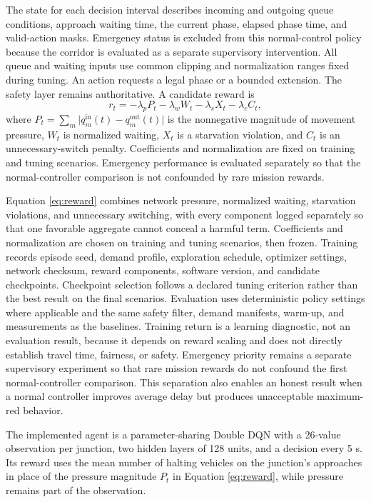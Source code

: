 The state for each decision interval describes incoming and outgoing queue conditions, approach waiting time, the current phase, elapsed phase time, and valid-action masks. Emergency status is excluded from this normal-control policy because the corridor is evaluated as a separate supervisory intervention. All queue and waiting inputs use common clipping and normalization ranges fixed during tuning. An action requests a legal phase or a bounded extension. The safety layer remains authoritative. A candidate reward is
\begin{equation}
r_t=-\lambda_p P_t-\lambda_w W_t-\lambda_s X_t-\lambda_c C_t,
\label{eq:reward}
\end{equation}
where $P_t=\sum_m\lvert q_m^{\mathrm{in}}(t)-q_m^{\mathrm{out}}(t)\rvert$ is the nonnegative magnitude of movement pressure, $W_t$ is normalized waiting, $X_t$ is a starvation violation, and $C_t$ is an unnecessary-switch penalty. Coefficients and normalization are fixed on training and tuning scenarios. Emergency performance is evaluated separately so that the normal-controller comparison is not confounded by rare mission rewards.

Equation \ref{eq:reward} combines network pressure, normalized waiting, starvation violations, and unnecessary switching, with every component logged separately so that one favorable aggregate cannot conceal a harmful term. Coefficients and normalization are chosen on training and tuning scenarios, then frozen. Training records episode seed, demand profile, exploration schedule, optimizer settings, network checksum, reward components, software version, and candidate checkpoints. Checkpoint selection follows a declared tuning criterion rather than the best result on the final scenarios. Evaluation uses deterministic policy settings where applicable and the same safety filter, demand manifests, warm-up, and measurements as the baselines. Training return is a learning diagnostic, not an evaluation result, because it depends on reward scaling and does not directly establish travel time, fairness, or safety. Emergency priority remains a separate supervisory experiment so that rare mission rewards do not confound the first normal-controller comparison. This separation also enables an honest result when a normal controller improves average delay but produces unacceptable maximum-red behavior.

The implemented agent is a parameter-sharing Double DQN with a 26-value observation per junction, two hidden layers of 128 units, and a decision every 5 s. Its reward uses the mean number of halting vehicles on the junction's approaches in place of the pressure magnitude $P_t$ in Equation \ref{eq:reward}, while pressure remains part of the observation.

